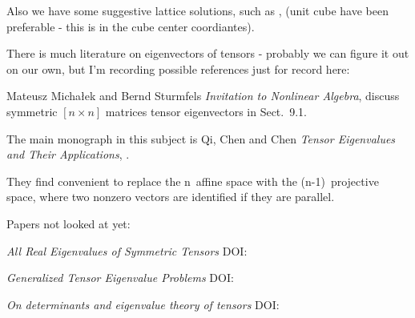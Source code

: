 Also we have some suggestive lattice solutions, such as
, 
(unit cube have been preferable - this is in the cube center coordiantes).

There is much literature on eigenvectors of tensors - probably we can
figure it out on our own, but I'm recording possible references just for
record here:

\begin{description}


\item[2020-02-14 Predrag]
Mateusz Micha{\l}ek and Bernd Sturmfels
{\em Invitation to Nonlinear Algebra},  
discuss symmetric $[n\!\times\!n]$ matrices tensor eigenvectors in Sect.~9.1.

The main monograph in this subject is
Qi, Chen and Chen
{\em Tensor Eigenvalues and Their Applications},  .

They find convenient to replace the n\dmn\ affine space  with the
(n-1)\dmn\ projective space, where two nonzero vectors are identified if
they are parallel.

Papers not looked at yet:

{\em All Real Eigenvalues of Symmetric Tensors}
 {DOI}:

{\em Generalized Tensor Eigenvalue Problems}
 {DOI}:

 {\em On determinants and eigenvalue theory of tensors}
 {DOI}:






\end{description}


